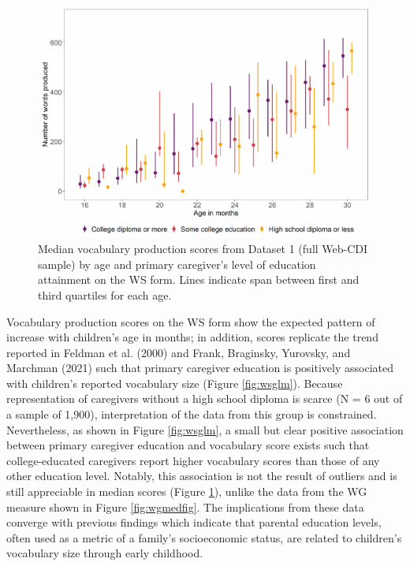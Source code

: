 \documentclass[
  english,
  ,man,floatsintext]{apa6}
\begin{document}
\begin{figure}
\centering
\includegraphics{webcdi_paper_files/figure-latex/wsmedfig-1.pdf}
\caption{\label{fig:wsmedfig}Median vocabulary production scores from Dataset 1 (full Web-CDI sample) by age and primary caregiver's level of education attainment on the WS form. Lines indicate span between first and third quartiles for each age.}
\end{figure}

Vocabulary production scores on the WS form show the expected pattern of increase with children's age in months; in addition, scores replicate the trend reported in Feldman et al. (2000) and Frank, Braginsky, Yurovsky, and Marchman (2021) such that primary caregiver education is positively associated with children's reported vocabulary size (Figure \ref{fig:wsglm}). Because representation of caregivers without a high school diploma is scarce (N = 6 out of a sample of 1,900), interpretation of the data from this group is constrained. Nevertheless, as shown in Figure \ref{fig:wsglm}, a small but clear positive association between primary caregiver education and vocabulary score exists such that college-educated caregivers report higher vocabulary scores than those of any other education level. Notably, this association is not the result of outliers and is still appreciable in median scores (Figure \ref{fig:wsmedfig}), unlike the data from the WG measure shown in Figure \ref{fig:wgmedfig}. The implications from these data converge with previous findings which indicate that parental education levels, often used as a metric of a family's socioeconomic status, are related to children's vocabulary size through early childhood.
\end{document}
